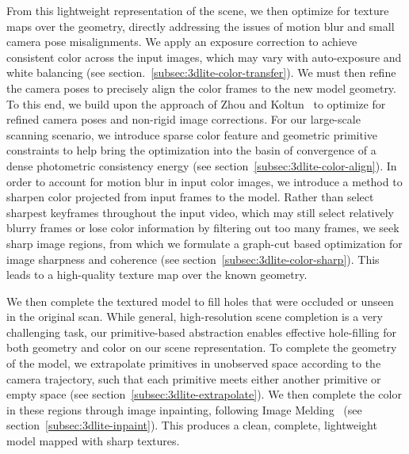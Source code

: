 From this lightweight representation of the scene, we then optimize for texture maps over the geometry, directly addressing the issues of motion blur and small camera pose misalignments.
We apply an exposure correction to achieve consistent color across the input images, which may vary with auto-exposure and white balancing (see section.~\ref{subsec:3dlite-color-transfer}).
We must then refine the camera poses to precisely align the color frames to the new model geometry.
To this end, we build upon the approach of Zhou and Koltun~\cite{zhou2014color} to optimize for refined camera poses and non-rigid image corrections.
For our large-scale scanning scenario, we introduce sparse color feature and geometric primitive constraints to help bring the optimization into the basin of convergence of a dense photometric consistency energy (see section~\ref{subsec:3dlite-color-align}).
In order to account for motion blur in input color images, we introduce a method to sharpen color projected from input frames to the model.
Rather than select sharpest keyframes throughout the input video, which may still select relatively blurry frames or lose color information by filtering out too many frames, we seek sharp image regions, from which we formulate a graph-cut based optimization for image sharpness and coherence (see section~\ref{subsec:3dlite-color-sharp}). 
This leads to a high-quality texture map over the known geometry.

We then complete the textured model to fill holes that were occluded or unseen in the original scan.
While general, high-resolution scene completion is a very challenging task, our primitive-based abstraction enables effective hole-filling for both geometry and color on our scene representation.
To complete the geometry of the model, we extrapolate primitives in unobserved space according to the camera trajectory, such that each primitive meets either another primitive or empty space (see section~\ref{subsec:3dlite-extrapolate}). %
We then complete the color in these regions through image inpainting, following  Image Melding~\cite{darabi2012image} (see section~\ref{subsec:3dlite-inpaint}).
This produces a clean, complete, lightweight model mapped with sharp textures.
